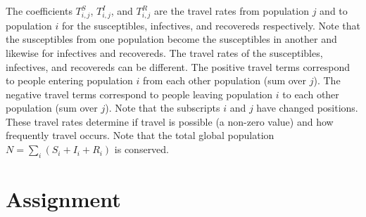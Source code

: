 \documentclass[letter]{article}
\begin{document}
The coefficients $T^S_{i,j}$, $T^I_{i,j}$, and $T^R_{i,j}$ are the travel rates from population $j$ and to population $i$ for the susceptibles, infectives, and recovereds respectively. Note that the susceptibles from one population become the susceptibles in another and likewise for infectives and recovereds. The travel rates of the susceptibles, infectives, and recovereds can be different. The positive travel terms correspond to people entering population $i$ from each other population (sum over $j$). The negative travel terms correspond to people leaving population $i$ to each other population (sum over $j$). Note that the subscripts $i$ and $j$ have changed positions. These travel rates determine if travel is possible (a non-zero value) and how frequently travel occurs. Note that the total global population $\displaystyle N = \sum_i (S_i + I_i + R_i)$ is conserved.



\section{Assignment}
\end{document}

